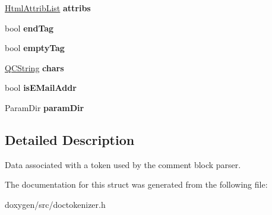 \begin{DoxyCompactItemize}
\item 
\mbox{\label{struct_token_info_a811b08400dcdf6aa65b3fd3149b890c9}} 
\mbox{\hyperlink{class_html_attrib_list}{Html\+Attrib\+List}} {\bfseries attribs}
\item 
\mbox{\label{struct_token_info_a8492fcbbf13ce7dbb7fa8d1eaa9d1e91}} 
bool {\bfseries end\+Tag}
\item 
\mbox{\label{struct_token_info_afc2259af930fe0364268ed684b558629}} 
bool {\bfseries empty\+Tag}
\item 
\mbox{\label{struct_token_info_a7dc1ad1cf0a4e237d7be47b02092d6eb}} 
\mbox{\hyperlink{class_q_c_string}{Q\+C\+String}} {\bfseries chars}
\item 
\mbox{\label{struct_token_info_aea756802b18b2753726cbea140961282}} 
bool {\bfseries is\+E\+Mail\+Addr}
\item 
\mbox{\label{struct_token_info_a133bc92e279cd9709b8f9b018498d938}} 
Param\+Dir {\bfseries param\+Dir}
\end{DoxyCompactItemize}


\subsection{Detailed Description}
Data associated with a token used by the comment block parser. 

The documentation for this struct was generated from the following file\+:\begin{DoxyCompactItemize}
\item 
doxygen/src/doctokenizer.\+h\end{DoxyCompactItemize}
